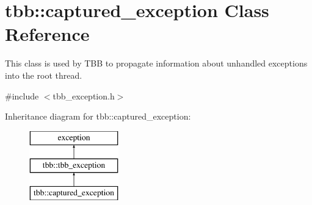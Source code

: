 \hypertarget{classtbb_1_1captured__exception}{}\section{tbb\+:\+:captured\+\_\+exception Class Reference}
\label{classtbb_1_1captured__exception}


This class is used by T\+B\+B to propagate information about unhandled exceptions into the root thread.  




{\ttfamily \#include $<$tbb\+\_\+exception.\+h$>$}

Inheritance diagram for tbb\+:\+:captured\+\_\+exception\+:\begin{figure}[H]
\begin{center}
\leavevmode
\includegraphics[height=3.000000cm]{classtbb_1_1captured__exception}
\end{center}
\end{figure}
